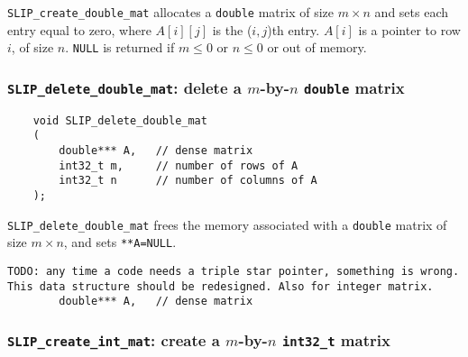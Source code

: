 \documentclass[12pt]{article}
\theoremstyle{definition}
\begin{document}
\verb|SLIP_create_double_mat| allocates a \verb|double| matrix of size $m
\times n$ and sets each entry equal to zero, where $A[i][j]$ is the ($i,j$)th
entry. $A[i]$ is a pointer to row $i$, of size $n$. \verb|NULL| is returned if
$m \le 0 $ or $n\le 0$ or out of memory.




\cprotect\subsubsection{\verb|SLIP_delete_double_mat|: delete a $m$-by-$n$ \verb|double| matrix}

\begin{mdframed}[userdefinedwidth=6in]
{\footnotesize
\begin{verbatim}
    void SLIP_delete_double_mat
    (
        double*** A,   // dense matrix
        int32_t m,     // number of rows of A
        int32_t n      // number of columns of A
    );
\end{verbatim}
} \end{mdframed}

\verb|SLIP_delete_double_mat| frees the memory associated with a \verb|double|
matrix of size $m \times n$, and sets \verb|**A=NULL|.


\begin{verbatim}
TODO: any time a code needs a triple star pointer, something is wrong.
This data structure should be redesigned. Also for integer matrix.
        double*** A,   // dense matrix
\end{verbatim}

\cprotect\subsubsection{\verb|SLIP_create_int_mat|: create a $m$-by-$n$ \verb|int32_t| matrix}
\end{document}
